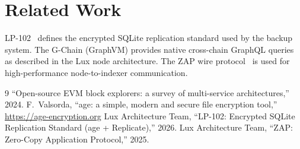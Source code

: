 \section{Related Work}


LP-102~\cite{lp102} defines the encrypted SQLite replication standard used by the backup
system. The G-Chain (GraphVM) provides native cross-chain GraphQL queries as described in
the Lux node architecture. The ZAP wire protocol~\cite{zap} is used for high-performance
node-to-indexer communication.

\begin{thebibliography}{9}
 ``Open-source EVM block explorers: a survey of multi-service architectures,'' 2024.
 F.~Valsorda, ``age: a simple, modern and secure file encryption tool,'' \url{https://age-encryption.org}
 Lux Architecture Team, ``LP-102: Encrypted SQLite Replication Standard (age + Replicate),'' 2026.
 Lux Architecture Team, ``ZAP: Zero-Copy Application Protocol,'' 2025.
\end{thebibliography}

